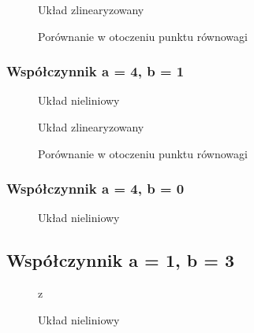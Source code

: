 \documentclass[a4paper, 10pt]{article}
\begin{document}
				\begin{figure}[H]
					\centering
					\def \svgwidth{0.75\columnwidth}
					
					\caption{Układ zlinearyzowany}
				\end{figure}\noindent


				\begin{figure}[H]
					\centering
					\def \svgwidth{0.75\columnwidth}
					
					\caption{Porównanie w otoczeniu punktu równowagi}
				\end{figure}\noindent

			\subsubsection{Współczynnik a = 4, b = 1}
				\begin{figure}[H]
					\centering
					\def \svgwidth{0.75\columnwidth}
					
					\caption{Układ nieliniowy}
				\end{figure}\noindent


				\begin{figure}[H]
					\centering
					\def \svgwidth{0.75\columnwidth}
					
					\caption{Układ zlinearyzowany}
				\end{figure}\noindent



				\begin{figure}[H]
					\centering
					\def \svgwidth{0.75\columnwidth}
					
					\caption{Porównanie w otoczeniu punktu równowagi}
				\end{figure}\noindent

			\subsubsection{Współczynnik a = 4, b = 0}
				\begin{figure}[H]
					\centering
					\def \svgwidth{0.75\columnwidth}
					
					\caption{Układ nieliniowy}
				\end{figure}\noindent

			\subsection{Współczynnik a = 1, b = 3}
				\begin{figure}[H]
					\centering
					\def \svgwidth{0.75\columnwidth}z
					
					\caption{Układ nieliniowy}
				\end{figure}\noindent
\end{document}
